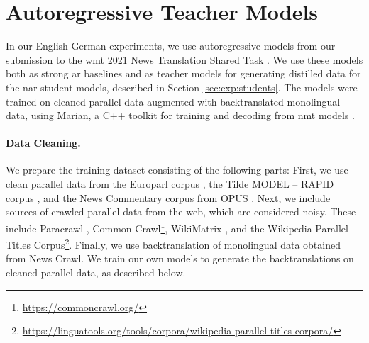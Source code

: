 \section{Autoregressive Teacher Models}%
\label{sec:exp:teachers}


\noindent
In our English-German experiments, we use autoregressive models from our
submission to the \ac{wmt} 2021 News Translation Shared Task
\citep{chen-etal-2021-university}. We use these models both as strong \ac{ar}
baselines and as teacher models for generating distilled data for the \ac{nar}
student models, described in Section \ref{sec:exp:students}. The models were
trained on cleaned parallel data augmented with backtranslated monolingual
data, using Marian, a C++ toolkit for training and decoding from \ac{nmt}
models \citep{junczys-dowmunt-etal-2018-marian}.


\paragraph{Data Cleaning.} We prepare the training dataset consisting of the
following parts: First, we use clean parallel data from the Europarl corpus
\citep{koehn-2005-europarl}, the Tilde MODEL -- RAPID corpus
\citep{rozis-skadins-2017-tilde}, and the News Commentary corpus from OPUS
\citep{tiedemann-2012-parallel}. Next, we include sources of crawled parallel
data from the web, which are considered noisy. These include Paracrawl
\citep{espla-etal-2019-paracrawl}, Common
Crawl\footnote{\url{https://commoncrawl.org/}}, WikiMatrix
\citep{schwenk2019wikimatrix}, and the Wikipedia Parallel Titles
Corpus\footnote{\url{https://linguatools.org/tools/corpora/wikipedia-parallel-titles-corpora/}}. Finally,
we use backtranslation \citep{sennrich-etal-2016-improving} of monolingual data
obtained from News Crawl.  We train our own models to generate the
backtranslations on cleaned parallel data, as described below.

